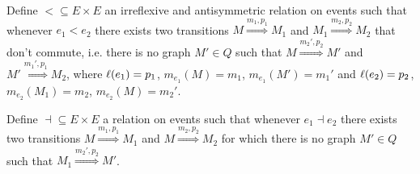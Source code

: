 \begin{definition}
  Define $< \subseteq E\times E$ an irreflexive and antisymmetric relation on events such that whenever $e_1 < e_2$ there exists two transitions $M\overset{m_1,p_1}{\Rightarrow} M_1$ and $M_1\overset{m_2,p_2}{\Rightarrow} M_2$ that don't commute, i.e. there is no graph $M'\in Q$ such that $M\overset{m_2',p_2}{\Rightarrow} M'$ and $M'\overset{m_1',p_1}{\Rightarrow} M_2$, where $\ell(e_1)=p_1$, $m_{e_1}(M) = m_1$, $m_{e_1}(M') = m_1'$ and $\ell(e_2)=p_2$, $m_{e_2}(M_1) = m_2$, $m_{e_2}(M) = m_2'$.
\end{definition}

\begin{definition}[Inhibition]
  Define $\dashv\subseteq E \times E$ a relation on events such that whenever $e_1\dashv e_2$ there exists two transitions $M\overset{m_1,p_1}{\Rightarrow} M_1$ and $M\overset{m_2,p_2}{\Rightarrow} M_2$ for which there is no graph $M'\in Q$ such that $M_1\overset{m_2',p_2}{\Rightarrow} M'$.
\end{definition}
